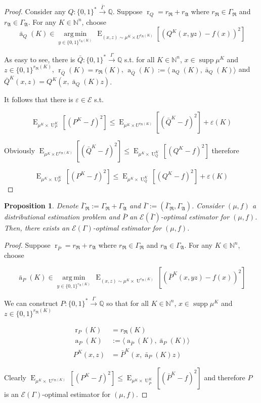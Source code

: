 \documentclass{article}
\numberwithin{equation}{section}
\theoremstyle{definition}
\theoremstyle{plain}
\newtheorem{proposition}{Proposition}[section]
\newcommand{\Bool}{\{0,1\}}
\newcommand{\Words}{{\Bool^*}}
\newcommand{\WordsLen}[1]{{\Bool^{#1}}}
\DeclareMathOperator{\Supp}{supp}
\DeclareMathOperator{\E}{E}
\DeclareMathOperator{\R}{r}
\DeclareMathOperator{\A}{a}
\DeclareMathOperator{\Un}{U}
\newcommand{\Argmin}[1]{\underset{#1}{\operatorname{arg\,min}}\,}
\newcommand{\Nats}{\mathbb{N}}
\newcommand{\Rats}{\mathbb{Q}}
\newcommand{\Chev}[1]{\langle #1 \rangle}
\newcommand{\GrowR}{\Gamma_{\mathfrak{R}}}
\newcommand{\GrowA}{\Gamma_{\mathfrak{A}}}
\newcommand{\Fall}{\mathcal{E}}
\newcommand{\EG}{\Fall(\Gamma)}
\newcommand{\Scheme}{\xrightarrow{\Gamma}}
\begin{document}
\begin{proof}

Consider any $Q: \Words \xrightarrow{\bar{\Gamma}} \Rats$. Suppose $\R_Q=r_{\mathfrak{R}}+r_{\mathfrak{A}}$ where $r_{\mathfrak{R}} \in \GrowR$ and $r_{\mathfrak{A}} \in \GrowA$. For any $K \in \Nats^n$, choose 
\[\bar{\A}_Q(K) \in \Argmin{y \in \WordsLen{r_{\mathfrak{A}}(K)}} \E_{(x,z) \sim \mu^{K} \times U^{r_{\mathfrak{R}}(K)}}[(Q^{K}(x,yz) - f(x))^2]\]

As easy to see, there is $\bar{Q}: \Words \Scheme \Rats$ s.t. for all $K \in \Nats^n$, $x \in \Supp \mu^{K}$ and $z \in \WordsLen{r_{\mathfrak{R}}(K)}$, $\R_{\bar{Q}}(K) = r_{\mathfrak{R}}(K)$, ${\A_{\bar{Q}}(K):=\Chev{\A_Q(K),\bar{\A}_Q(K)}}$ and ${\bar{Q}^{K}(x,z)=Q^{K}(x,\bar{\A}_Q(K)z)}$.

It follows that there is $\varepsilon \in \Fall$ s.t.

$$\E_{\mu^{K} \times \Un_P^{K}}[(P^{K} - f)^2] \leq \E_{\mu^{K} \times U^{r_{\mathfrak{R}}(K)}}[(\bar{Q}^{K} - f)^2] + \varepsilon(K)$$

Obviously $\E_{\mu^{K} \times U^{r_{\mathfrak{R}}(K)}}[(\bar{Q}^{K} - f)^2] \leq \E_{\mu^{K} \times \Un_Q^{K}}[(Q^{K} - f)^2]$ therefore

$$\E_{\mu^{K} \times \Un_P^{K}}[(P^{K} - f)^2] \leq \E_{\mu^{K} \times \Un_Q^{K}}[(Q^{K} - f)^2] + \varepsilon(K)$$
\end{proof}

\begin{proposition}

Denote $\bar{\Gamma}_{\mathfrak{R}}:=\GrowR+\GrowA$ and $\bar{\Gamma}:=(\bar{\Gamma}_{\mathfrak{R}},\GrowA)$. Consider $(\mu,f)$ a distributional estimation problem and $\bar{P}$ an $\Fall(\bar{\Gamma})$-optimal estimator for $(\mu,f)$. Then, there exists an $\EG$-optimal estimator for $(\mu,f)$.

\end{proposition}

\begin{proof}

Suppose $\R_{\bar{P}}=r_{\mathfrak{R}}+r_{\mathfrak{A}}$ where $r_{\mathfrak{R}} \in \GrowR$ and $r_{\mathfrak{A}} \in \GrowA$. For any ${K \in \Nats^n}$, choose 

\[\bar{\A}_P(K) \in \Argmin{y \in \WordsLen{r_{\mathfrak{A}}(K)}} \E_{(x,z) \sim \mu^{K} \times \Un^{r_{\mathfrak{R}}(K)}}[(\bar{P}^{K}(x,yz) - f(x))^2]\]

We can construct $P: \Words \Scheme \Rats$ so that for all $K \in \Nats^n$, $x \in \Supp \mu^{K}$ and ${z \in \WordsLen{r_{\mathfrak{R}}(K)}}$

\begin{align*}
\R_P(K) &= r_{\mathfrak{R}}(K) \\
\A_P(K) &:=\Chev{\A_{\bar{P}}(K),\bar{\A}_P(K)} \\
P^{K}(x,z) &=\bar{P}^{K}(x,\bar{\A}_P(K)z)
\end{align*}

Clearly ${\E_{\mu^{K} \times \Un^{r_{\mathfrak{R}}(K)}}[(P^{K} - f)^2] \leq \E_{\mu^{K} \times \Un_{\bar{P}}^{K}}[(\bar{P}^{K} - f)^2]}$ and therefore $P$ is an $\EG$-optimal estimator for $(\mu,f)$.
\end{proof}
\end{document}
